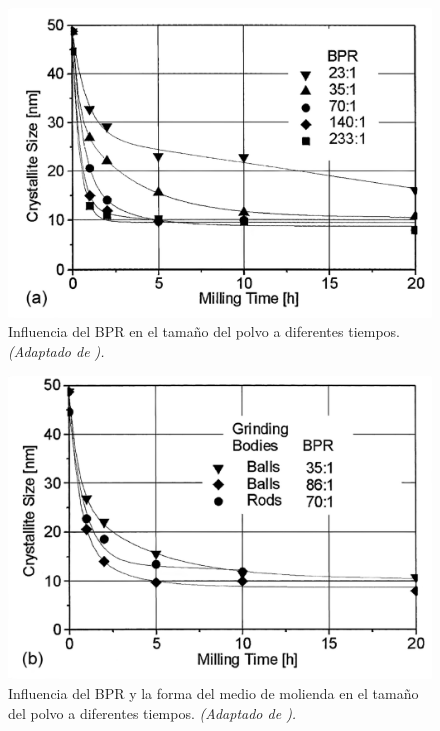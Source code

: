 \documentclass[%
spanish,
progressbar=head,
subsectionpage,
aspectratio=169
]{beamer}
\begin{document}
\begin{frame}
    \begin{figure}
        \centering
        \includegraphics[height=0.8\pageheight]{figuras/suryanarayana2004p68-a.png}
        \caption{Influencia del BPR en el tamaño del polvo a diferentes tiempos. \textit{(Adaptado de \textcite[68]{suryanarayanaMechanicalAlloyingMilling2004}).}}
    \end{figure}
\end{frame}

\begin{frame}
    \begin{figure}
        \centering
        \includegraphics[height=0.8\pageheight]{figuras/suryanarayana2004p68-b.png}
        \caption{Influencia del BPR  y la forma del medio de molienda en el tamaño del polvo a diferentes tiempos. \textit{(Adaptado de \textcite[68]{suryanarayanaMechanicalAlloyingMilling2004}).}}
    \end{figure}
\end{frame}
\end{document}
